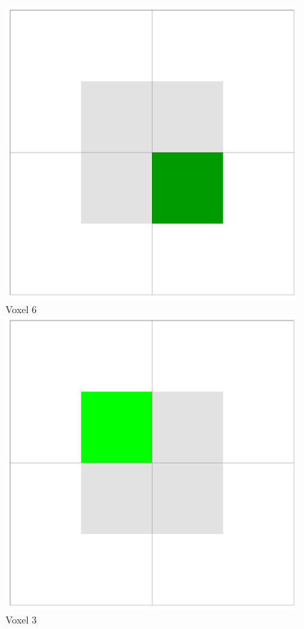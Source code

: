 \begin{figure}[!htb]
  \includegraphics[width=\linewidth]{drawings/cubes_06.pdf}
  Voxel 6
\endminipage\hfill
{}%
  \includegraphics[width=\linewidth]{drawings/cubes_03.pdf}
  Voxel 3
  

\end{figure}
